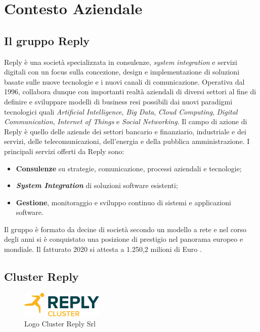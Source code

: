 \graphicspath{{./chapters/01/assets/} }
\chapter{Contesto Aziendale}
\label{cha:intro}

\section{Il gruppo Reply}
Reply è una società specializzata in consulenze, \textit{system integration} e servizi digitali con un focus sulla concezione, design e implementazione di soluzioni basate sulle nuove tecnologie e i nuovi canali di comunicazione. Operativa dal 1996, collabora dunque con importanti realtà aziendali di diversi settori al fine di definire e sviluppare modelli di business resi possibili dai nuovi paradigmi tecnologici quali \textit{Artificial Intelligence}, \textit{Big Data}, \textit{Cloud Computing}, \textit{Digital Communication}, \textit{Internet of Things} e \textit{Social Networking}.
Il campo di azione di Reply è quello delle aziende dei settori bancario e finanziario, industriale e dei servizi, delle telecomunicazioni, dell'energia e della pubblica amministrazione.
I principali servizi offerti da Reply sono:
\begin{itemize}
  \item \textbf{Consulenze} su strategie, comunicazione, processi aziendali e tecnologie;
  \item \textbf{\textit{System Integration}} di soluzioni software esistenti;
  \item \textbf{Gestione}, monitoraggio e sviluppo continuo di sistemi e applicazioni software.
\end{itemize}

Il gruppo è formato da decine di società secondo un modello a rete e nel corso degli anni si è conquistato una posizione di prestigio nel panorama europeo e mondiale. Il fatturato 2020 si attesta a 1.250,2 milioni di Euro \cite{fatturato}.

\section{Cluster Reply}

\begin{figure}[h]
  \centering
  \includegraphics[width=0.35\textwidth]{logo-cluster-reply.png}
  \caption{Logo Cluster Reply Srl}
  \label{fig:replyClusterLogo}
\end{figure}

